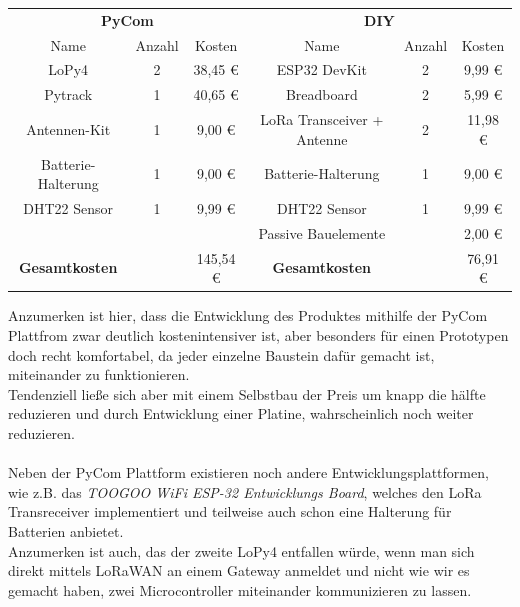 \begin{adjustwidth}{-1in}{-1in}%
	\begin{center}

	        \begin{tabular}{cccccc}
			\toprule
			\multicolumn{3}{c}{\textbf{PyCom}} & \multicolumn{3}{c}{\textbf{DIY}}\\

			Name & Anzahl & Kosten & Name & Anzahl & Kosten\\

			\midrule
			LoPy4 & 2 & 38,45 € & ESP32 DevKit & 2 & 9,99 €\\
			Pytrack  & 1 & 40,65 € & Breadboard & 2 & 5,99 €\\
			Antennen-Kit  & 1 & 9,00 € & LoRa Transceiver + Antenne & 2 & 11,98 €\\
			Batterie-Halterung & 1 & 9,00 € & Batterie-Halterung & 1 & 9,00 € \\
			DHT22 Sensor & 1 & 9,99 € & DHT22 Sensor & 1 & 9,99 €\\
			 &  &  & Passive Bauelemente &  & 2,00 €\\

			\midrule
			\textbf{Gesamtkosten} & & 145,54 € & \textbf{Gesamtkosten} & & 76,91 €\\

			\bottomrule

	        \end{tabular}
		\label{}
		 \label{tab:kostenaustellung} 
	\end{center}
\end{adjustwidth}

Anzumerken ist hier, dass die Entwicklung des Produktes mithilfe der PyCom Plattfrom zwar deutlich kostenintensiver ist, aber besonders für einen Prototypen doch recht komfortabel, da jeder einzelne Baustein dafür gemacht ist, miteinander zu funktionieren.\\
Tendenziell ließe sich aber mit einem Selbstbau der Preis um knapp die hälfte reduzieren und durch Entwicklung einer Platine, wahrscheinlich noch weiter reduzieren.\\\\
Neben der PyCom Plattform existieren noch andere Entwicklungsplattformen, wie z.B. das \textit{TOOGOO WiFi ESP-32 Entwicklungs Board}, welches den LoRa Transreceiver implementiert und teilweise auch schon eine Halterung für Batterien anbietet.\\
Anzumerken ist auch, das der zweite LoPy4 entfallen würde, wenn man sich direkt mittels LoRaWAN an einem Gateway anmeldet und nicht wie wir es gemacht haben, zwei Microcontroller miteinander kommunizieren zu lassen.\\

